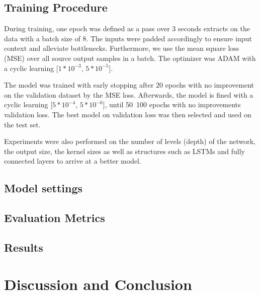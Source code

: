 \documentclass[final]{cvpr}
\begin{document}
\subsection{Training Procedure}
During training, one epoch was defined as a pass over 3 seconds extracts on the data with a batch size of 8. The inputs were padded accordingly to ensure input context and alleviate bottlenecks. Furthermore, we use the mean square loss (MSE) over all source output samples in a batch. The optimizer was ADAM with a cyclic learning [$1*10^{-3}$, $5*10^{-5}$]. 

The model was trained with early stopping after 20 epochs with no improvement on the validation dataset by the MSE loss. Afterwards, the model is fined with a cyclic learning [$5*10^{-4}$, $5*10^{-6}$], until 50~100 epochs with no improvements validation loss. The best model on validation loss was then selected and used on the test set. 

Experiments were also performed on the number of levels (depth) of the network, the output size, the kernel sizes as well as structures such as LSTMs and fully connected layers to arrive at a better model.   
\subsection{Model settings}

\subsection{Evaluation Metrics}

\subsection{Results}
\section*{Discussion and Conclusion}
{\small


}
\end{document}
